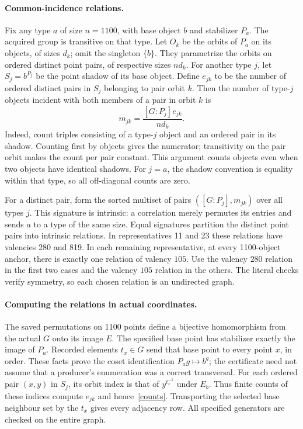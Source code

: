 \documentclass[11pt]{article}
\begin{document}
\paragraph{Common-incidence relations.}
Fix any type $a$ of size $n=1100$, with base object $b$ and stabilizer
$P_a$. The acquired group is transitive on that type. Let $O_k$ be
the orbits of $P_a$ on its objects, of sizes $d_k$; omit the singleton
$\{b\}$. They parametrize the orbits on ordered distinct point pairs,
of respective sizes $nd_k$. For another type $j$, let
$S_j=b^{P_j}$ be the point shadow of its base object. Define $e_{jk}$
to be the number of ordered distinct pairs in $S_j$ belonging to pair
orbit $k$. Then the number of type-$j$ objects incident with both
members of a pair in orbit $k$ is
\begin{equation}\label{counts}
                  m_{jk}=\frac{[G:P_j]e_{jk}}{nd_k}.
\end{equation}
Indeed, count triples consisting of a type-$j$ object and an ordered
pair in its shadow. Counting first by objects gives the numerator;
transitivity on the pair orbit makes the count per pair constant.
This argument counts objects even when two objects have identical shadows.
For $j=a$, the shadow convention is equality within that type,
so all off-diagonal counts are zero.

For a distinct pair, form the sorted multiset of pairs
$([G:P_j],m_{jk})$ over all types $j$. This signature is intrinsic:
a correlation merely permutes its entries and sends $a$ to a type of
the same size. Equal signatures partition the distinct point pairs
into intrinsic relations. In representatives 11 and 23 these relations
have valencies 280 and 819. In each remaining representative, at
every 1100-object anchor, there is exactly one relation of valency $105$.
Use the valency $280$ relation in the first two cases and the valency $105$
relation in the others. The literal checks verify symmetry, so each
chosen relation is an undirected graph.

\paragraph{Computing the relations in actual coordinates.}
The saved permutations on 1100 points define a bijective homomorphism
from the actual $G$ onto its image $E$. The specified base point has
stabilizer exactly the image of $P_a$. Recorded elements $t_x\in G$
send that base point to every point $x$, in order. These facts prove
the coset identification $P_ag\mapsto b^g$; the certificate need not
assume that a producer's enumeration was a correct transversal.
For each ordered pair $(x,y)$ in $S_j$, its orbit index is that of
$y^{t_x^{-1}}$ under $E_b$. Thus finite counts of these indices compute
$e_{jk}$ and hence~\eqref{counts}. Transporting the selected base
neighbour set by the $t_x$ gives every adjacency row. All specified
generators are checked on the entire graph.
\end{document}
